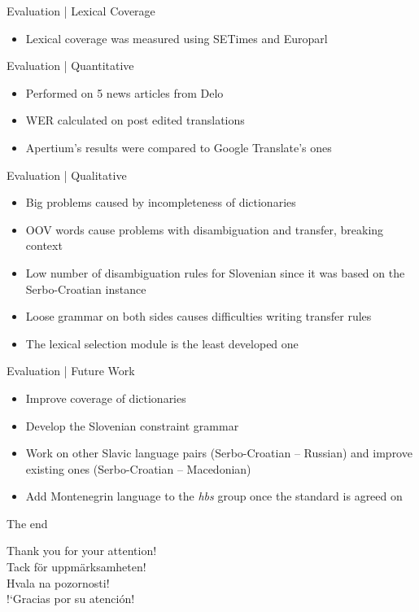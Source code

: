 \documentclass{beamer}
\begin{document}

\begin{frame}{Evaluation | Lexical Coverage}
\begin{itemize}
\item Lexical coverage was measured using SETimes and Europarl
\end{itemize}


\end{frame}


\begin{frame}{Evaluation | Quantitative }
\begin{itemize}
\item Performed on 5 news articles from Delo
\item WER calculated on post edited translations
\item Apertium's results were compared to Google Translate's ones
\end{itemize}

\end{frame}


\begin{frame}{Evaluation | Qualitative }
\begin{itemize}
\item Big problems caused by incompleteness of dictionaries
\item OOV words cause problems with disambiguation and transfer, breaking context
\item Low number of disambiguation rules for Slovenian since it was based on the Serbo-Croatian instance
\item Loose grammar on both sides causes difficulties writing transfer rules
\item The lexical selection module is the least developed one
\end{itemize}
\end{frame}


\begin{frame}{Evaluation | Future Work }
\begin{itemize}
\item Improve coverage of dictionaries
\item Develop the Slovenian constraint grammar
\item Work on other Slavic language pairs (Serbo-Croatian -- Russian) and improve existing ones (Serbo-Croatian -- Macedonian)
\item Add Montenegrin language to the \emph{hbs} group once the standard is agreed on

\end{itemize}
\end{frame}

\begin{frame}{ The end }
\begin{center}
\Large{
Thank you for your attention! \\
Tack för uppmärksamheten! \\
Hvala na pozornosti! \\
!`Gracias por su atenci\'{o}n! 
}
\end{center}

\end{frame}
\end{document}
